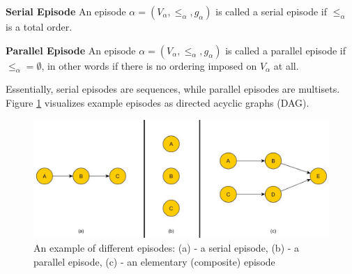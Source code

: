 \begin{mydef}
\label{def_serialEpisode}
\textbf{Serial Episode} An episode $\alpha = (V_\alpha,{\leq}_{\alpha},g_\alpha)$ is called a serial episode if ${\leq}_{\alpha}$ is a total order. \cite{mannila1995discovering}
\end{mydef}

\begin{mydef}
\label{def_parallelEpisode}
\textbf{Parallel Episode} An episode $\alpha = (V_\alpha,{\leq}_{\alpha},g_\alpha)$ is called a parallel episode if ${\leq}_{\alpha} = \emptyset$, in other words if there is no ordering imposed on $V_\alpha$ at all. \cite{mannila1995discovering}
\end{mydef}

Essentially, serial episodes are sequences, while parallel episodes are multisets. Figure \ref{fig_exampleEpisodes} visualizes example episodes as directed acyclic graphs (DAG).

\begin{figure}[h]
	\centering
  	\includegraphics[width=\textwidth]{exampleEpisodes}
	\caption[Example Episodes]{An example of different episodes: (a) - a serial episode, (b) - a parallel episode, (c) - an elementary (composite) episode}
	\label{fig_exampleEpisodes}
\end{figure}

%

